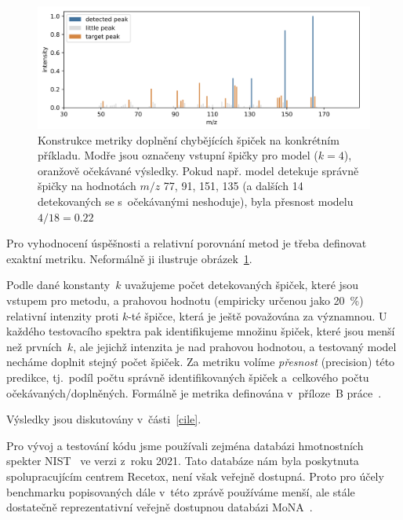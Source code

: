 \documentclass[a4paper,11pt]{article}
\begin{document}
\begin{figure}
\begin{center}
\includegraphics[width=.8\hsize]{metric-missing}
\end{center}
\caption{Konstrukce metriky doplnění chybějících špiček na konkrétním příkladu.
Modře jsou označeny vstupní špičky pro model ($k=4$), oranžově očekávané výsledky.
Pokud např. model detekuje správně špičky na hodnotách $m/z$ 77, 91, 151, 135 (a dalších 14 detekovaných se
s~očekávanými neshoduje), byla přesnost modelu $4/18 = 0.22$
}
\label{f:metric-missing}
\end{figure}

Pro vyhodnocení úspěšnosti a relativní porovnání metod je třeba definovat exaktní metriku.
Neformálně ji ilustruje obrázek~\ref{f:metric-missing}.

Podle dané konstanty~$k$ uvažujeme počet detekovaných špiček, které jsou vstupem pro metodu,
a prahovou hodnotu (empiricky určenou jako 20~\%) relativní intenzity proti $k$-té špičce,
která je ještě považována za významnou. 
U každého testovacího spektra pak identifikujeme množinu špiček, které jsou menší než prvních~$k$,
ale jejichž intenzita je nad prahovou hodnotou, a testovaný model necháme doplnit stejný počet špiček.
Za metriku volíme \emph{přesnost} (precision) této predikce, tj.\ podíl počtu správně identifikovaných špiček
a~celkového počtu očekávaných/doplněných.
Formálně je metrika definována v~příloze~B práce~\cite{stary}. 

Výsledky jsou diskutovány v~části~\ref{cile}.

Pro vývoj a testování kódu jsme používali zejména databázi hmotnostních spekter
NIST~\cite{nist} ve verzi z~roku 2021.
Tato databáze nám byla poskytnuta spolupracujícím centrem Recetox, není však veřejně dostupná.
Proto pro účely benchmarku popisovaných dále v~této zprávě používáme menší, ale stále dostatečně reprezentativní
veřejně dostupnou databázi MoNA~\cite{mona}.
\end{document}
